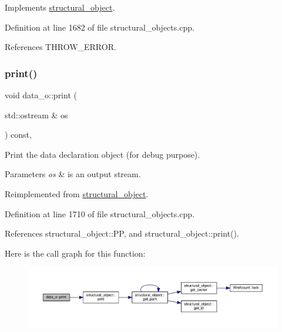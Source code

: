 Implements \hyperlink{classstructural__object_a3a8b2d38c2b5666700053a72868bb6b2}{structural\+\_\+object}.



Definition at line 1682 of file structural\+\_\+objects.\+cpp.



References T\+H\+R\+O\+W\+\_\+\+E\+R\+R\+OR.

\mbox{\label{classdata__o_a80e5ba60fe957aff679319a442c171b3}} 
\subsubsection{\texorpdfstring{print()}{print()}}
{\footnotesize\ttfamily void data\+\_\+o\+::print (\begin{DoxyParamCaption}\item[{std\+::ostream \&}]{os }\end{DoxyParamCaption}) const\hspace{0.3cm}{\ttfamily [override]}, {\ttfamily [virtual]}}



Print the data declaration object (for debug purpose). 


\begin{DoxyParams}{Parameters}
{\em os} & is an output stream. \\
\hline
\end{DoxyParams}


Reimplemented from \hyperlink{classstructural__object_a6770e169cf00f814a35b2939ec8f92eb}{structural\+\_\+object}.



Definition at line 1710 of file structural\+\_\+objects.\+cpp.



References structural\+\_\+object\+::\+PP, and structural\+\_\+object\+::print().

Here is the call graph for this function\+:
\nopagebreak
\begin{figure}[H]
\begin{center}
\leavevmode
\includegraphics[width=350pt]{d5/d34/classdata__o_a80e5ba60fe957aff679319a442c171b3_cgraph}
\end{center}
\end{figure}
\mbox{\label{classdata__o_ad0691851ebfeff0d27a8334669714482}} 
